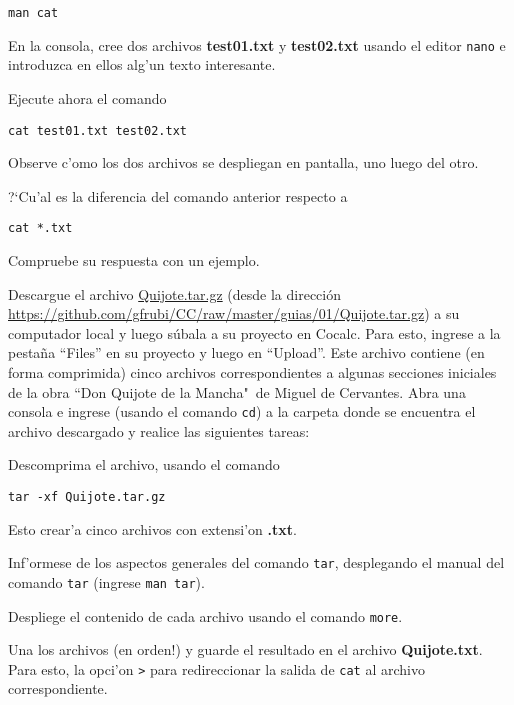 \documentclass[11pt]{exam}
\begin{document}
\begin{questions}
\begin{parts}
\begin{verbatim}
man cat
\end{verbatim}



\item En la consola, cree dos archivos \textbf{test01.txt} y \textbf{test02.txt} usando el editor \texttt{nano} e introduzca en ellos alg'un texto interesante.

\item Ejecute ahora el comando 

\begin{verbatim}
cat test01.txt test02.txt
\end{verbatim}

Observe c'omo los dos archivos se despliegan en pantalla, uno luego del otro.

\item ?`Cu'al es la diferencia del comando anterior respecto a 

\begin{verbatim}
cat *.txt
\end{verbatim}

Compruebe su respuesta con un ejemplo.
\end{parts}

\item Descargue el archivo \href{https://github.com/gfrubi/CC/raw/master/guias/01/Quijote.tar.gz}{Quijote.tar.gz} (desde la dirección \url{https://github.com/gfrubi/CC/raw/master/guias/01/Quijote.tar.gz}) a su computador local y luego súbala a su proyecto en Cocalc. Para esto, ingrese a la pestaña ``Files'' en su proyecto y luego en ``Upload''. Este archivo contiene (en forma comprimida) cinco archivos correspondientes a algunas secciones iniciales de la obra ``Don Quijote de la Mancha"\, de Miguel de Cervantes. Abra una consola e ingrese (usando el comando \texttt{cd}) a la carpeta donde se encuentra el archivo descargado y realice las siguientes tareas:
\begin{parts}
\item Descomprima el archivo, usando el comando 

\begin{verbatim}
tar -xf Quijote.tar.gz
\end{verbatim}

Esto crear'a cinco archivos con extensi'on \textbf{.txt}. 
\item Inf'ormese de los aspectos generales del comando \texttt{tar}, desplegando el manual del comando \texttt{tar} (ingrese \texttt{man tar}).
\item Despliege el contenido de cada archivo usando el comando \texttt{more}.
\item Una los archivos (en orden!) y guarde el resultado en el archivo \textbf{Quijote.txt}. Para esto, la opci'on \texttt{>} para redireccionar la salida de \texttt{cat} al archivo correspondiente.
\end{parts}


\end{questions}
\end{document}
